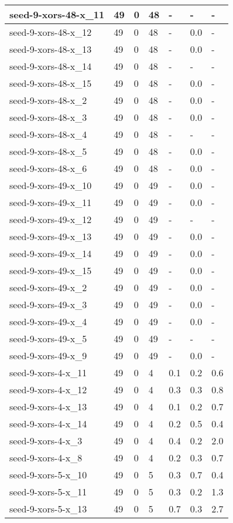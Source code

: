 \begin{scriptsize}
\begin{longtable}{|p{5cm}|l|l|l|l|l|l|}
seed-9-xors-48-x\_11&49&0&48&-&-&- \\ \hline 
seed-9-xors-48-x\_12&49&0&48&-&0.0&- \\ \hline 
seed-9-xors-48-x\_13&49&0&48&-&0.0&- \\ \hline 
seed-9-xors-48-x\_14&49&0&48&-&-&- \\ \hline 
seed-9-xors-48-x\_15&49&0&48&-&0.0&- \\ \hline 
seed-9-xors-48-x\_2&49&0&48&-&0.0&- \\ \hline 
seed-9-xors-48-x\_3&49&0&48&-&0.0&- \\ \hline 
seed-9-xors-48-x\_4&49&0&48&-&-&- \\ \hline 
seed-9-xors-48-x\_5&49&0&48&-&0.0&- \\ \hline 
seed-9-xors-48-x\_6&49&0&48&-&0.0&- \\ \hline 
seed-9-xors-49-x\_10&49&0&49&-&0.0&- \\ \hline 
seed-9-xors-49-x\_11&49&0&49&-&0.0&- \\ \hline 
seed-9-xors-49-x\_12&49&0&49&-&-&- \\ \hline 
seed-9-xors-49-x\_13&49&0&49&-&0.0&- \\ \hline 
seed-9-xors-49-x\_14&49&0&49&-&0.0&- \\ \hline 
seed-9-xors-49-x\_15&49&0&49&-&0.0&- \\ \hline 
seed-9-xors-49-x\_2&49&0&49&-&0.0&- \\ \hline 
seed-9-xors-49-x\_3&49&0&49&-&0.0&- \\ \hline 
seed-9-xors-49-x\_4&49&0&49&-&0.0&- \\ \hline 
seed-9-xors-49-x\_5&49&0&49&-&-&- \\ \hline 
seed-9-xors-49-x\_9&49&0&49&-&0.0&- \\ \hline 
seed-9-xors-4-x\_11&49&0&4&0.1&0.2&0.6 \\ \hline 
seed-9-xors-4-x\_12&49&0&4&0.3&0.3&0.8 \\ \hline 
seed-9-xors-4-x\_13&49&0&4&0.1&0.2&0.7 \\ \hline 
seed-9-xors-4-x\_14&49&0&4&0.2&0.5&0.4 \\ \hline 
seed-9-xors-4-x\_3&49&0&4&0.4&0.2&2.0 \\ \hline 
seed-9-xors-4-x\_8&49&0&4&0.2&0.3&0.7 \\ \hline 
seed-9-xors-5-x\_10&49&0&5&0.3&0.7&0.4 \\ \hline 
seed-9-xors-5-x\_11&49&0&5&0.3&0.2&1.3 \\ \hline 
seed-9-xors-5-x\_13&49&0&5&0.7&0.3&2.7 \\ \hline 

\end{longtable}
\end{scriptsize}
